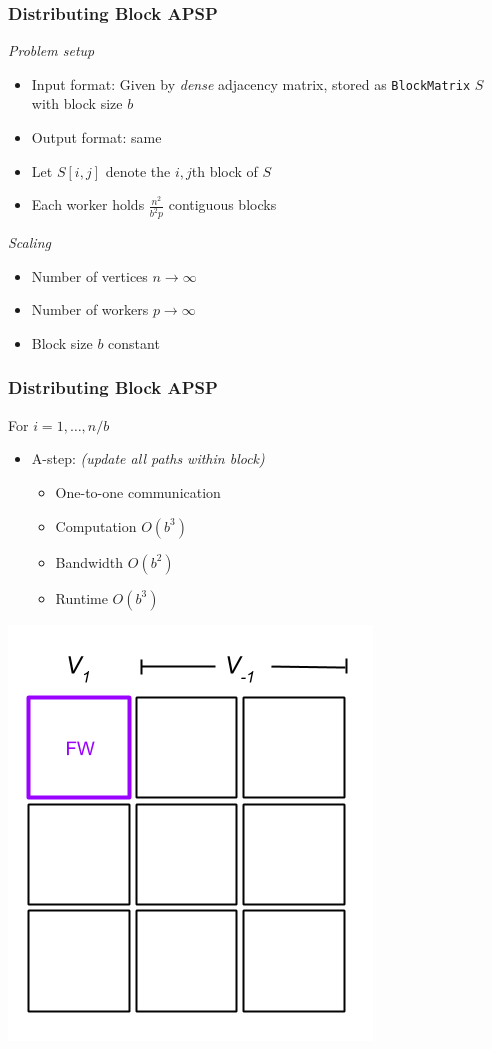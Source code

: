 \documentclass{beamer}
\begin{document}
\begin{frame}
\frametitle{Distributing Block APSP}
\emph{Problem setup}
\begin{itemize}
\item Input format: Given by \emph{dense} adjacency matrix, stored as {\tt BlockMatrix} $S$ with block size $b$
\item Output format: same
\item Let $S[i, j]$ denote the $i, j$th block of $S$
\item Each worker holds $\frac{n^2}{b^2p}$ contiguous blocks
\end{itemize}
\emph{Scaling}
\begin{itemize}
\item Number of vertices $n \to \infty$
\item Number of workers $p \to \infty$
\item Block size $b$ constant
\end{itemize}
\end{frame}

\begin{frame}
\frametitle{Distributing Block APSP}
For $i = 1,\hdots, n/b$
\begin{itemize}
\item A-step: \emph{(update all paths within block)}
\begin{itemize}
\item One-to-one communication
\item Computation $O(b^3)$
\item Bandwidth $O(b^2)$
\item Runtime $O(b^3)$
\end{itemize} 
\end{itemize}
\begin{center}
\includegraphics[scale = 0.3]{blockApsp-2.png}
\end{center}
\end{frame}
\end{document}

